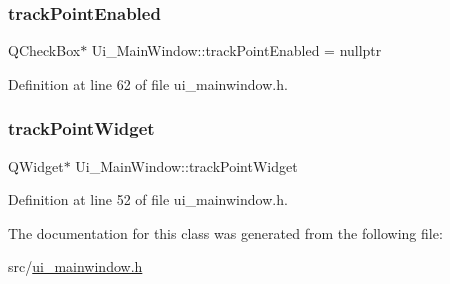 \subsubsection{\texorpdfstring{trackPointEnabled}{trackPointEnabled}}
{\footnotesize\ttfamily Q\+Check\+Box$\ast$ Ui\+\_\+\+Main\+Window\+::track\+Point\+Enabled = nullptr}



Definition at line 62 of file ui\+\_\+mainwindow.\+h.

\mbox{\label{class_ui___main_window_a20589136192063f4da16d6bf98dec50c}} 
\subsubsection{\texorpdfstring{trackPointWidget}{trackPointWidget}}
{\footnotesize\ttfamily Q\+Widget$\ast$ Ui\+\_\+\+Main\+Window\+::track\+Point\+Widget}



Definition at line 52 of file ui\+\_\+mainwindow.\+h.



The documentation for this class was generated from the following file\+:\begin{DoxyCompactItemize}
\item 
src/\mbox{\hyperlink{ui__mainwindow_8h}{ui\+\_\+mainwindow.\+h}}\end{DoxyCompactItemize}
